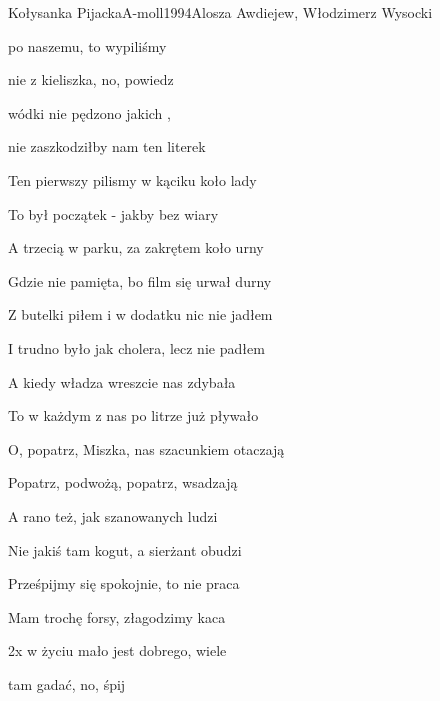 \begin{song}{Kołysanka Pijacka}{A-moll}{1994}{Alosza Awdiejew, Włodzimerz Wysocki}{}{}
	\begin{SBVerse}
	 po naszemu, to wypiliśmy 

	 nie z kieliszka, no, powiedz  

	 wódki nie pędzono jakich ,

	 nie zaszkodziłby nam ten literek 
	\end{SBVerse}
	\begin{SBVerse}
	Ten pierwszy pilismy w kąciku koło lady

	To był początek - jakby bez wiary

	A trzecią w parku, za zakrętem koło urny

	Gdzie nie pamięta, bo film się urwał durny
	\end{SBVerse}
	\begin{SBVerse}
	Z butelki piłem i w dodatku nic nie jadłem

	I trudno było jak cholera, lecz nie padłem

	A kiedy władza wreszcie nas zdybała

	To w każdym z nas po litrze już pływało
	\end{SBVerse}
	\begin{SBVerse}
	O, popatrz, Miszka, nas szacunkiem otaczają

	Popatrz, podwożą, popatrz, wsadzają

	A rano też, jak szanowanych ludzi

	Nie jakiś tam kogut, a sierżant obudzi
	\end{SBVerse}
	\begin{SBVerse}
	Prześpijmy się spokojnie, to nie praca

	Mam trochę forsy, złagodzimy kaca
	\end{SBVerse}
	\begin{SBBracket}{2x}
	 w życiu mało jest dobrego, wiele 

	 tam gadać, no, śpij  
	\end{SBBracket}
\end{song}
